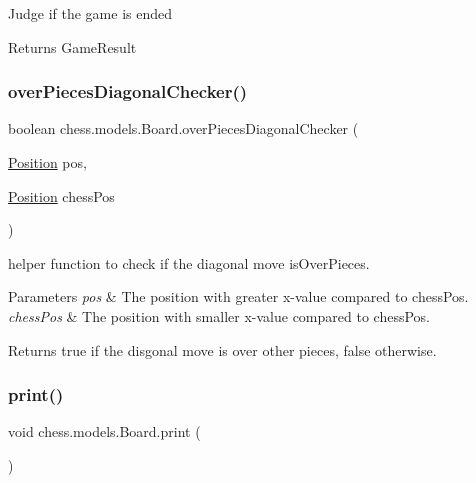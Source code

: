 Judge if the game is ended

\begin{DoxyReturn}{Returns}
Game\+Result 
\end{DoxyReturn}
\mbox{\label{classchess_1_1models_1_1_board_ade8f6def7998bb1bd22923e09a8a8c8b}} 
\subsubsection{\texorpdfstring{over\+Pieces\+Diagonal\+Checker()}{overPiecesDiagonalChecker()}}
{\footnotesize\ttfamily boolean chess.\+models.\+Board.\+over\+Pieces\+Diagonal\+Checker (\begin{DoxyParamCaption}\item[{\mbox{\hyperlink{classchess_1_1models_1_1_position}{Position}}}]{pos,  }\item[{\mbox{\hyperlink{classchess_1_1models_1_1_position}{Position}}}]{chess\+Pos }\end{DoxyParamCaption})\hspace{0.3cm}{\ttfamily [private]}}

helper function to check if the diagonal move is\+Over\+Pieces.


\begin{DoxyParams}{Parameters}
{\em pos} & The position with greater x-\/value compared to chess\+Pos. \\
\hline
{\em chess\+Pos} & The position with smaller x-\/value compared to chess\+Pos. \\
\hline
\end{DoxyParams}
\begin{DoxyReturn}{Returns}
true if the disgonal move is over other pieces, false otherwise. 
\end{DoxyReturn}
\mbox{\label{classchess_1_1models_1_1_board_af22da20d051a6cc31c6730e5dc80d81e}} 
\subsubsection{\texorpdfstring{print()}{print()}}
{\footnotesize\ttfamily void chess.\+models.\+Board.\+print (\begin{DoxyParamCaption}{ }\end{DoxyParamCaption})}

